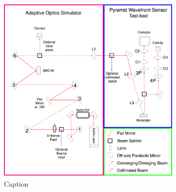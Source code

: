 \documentclass[12pt]{spieman}  %
\begin{document}
\begin{spacing}{2}
\begin{figure}
    \centering
    \includegraphics[width=0.8\textwidth]{CACTI.png}
    \caption{Caption}
    \label{fig:CACTI}
\end{figure}


\end{spacing}
\end{document}
